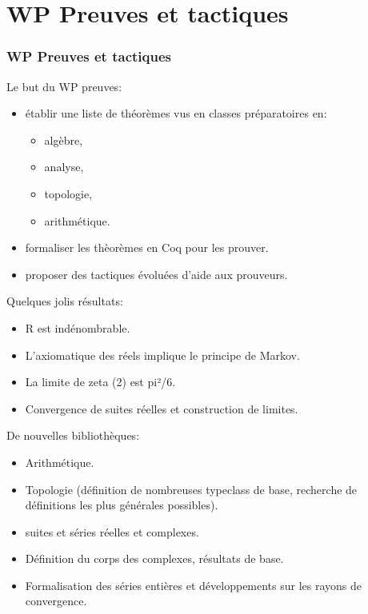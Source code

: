 \documentclass[slidetop]{beamer}
\begin{document}
\section{WP Preuves et tactiques}
\begin{frame}
\frametitle{WP Preuves et tactiques} 

Le but du WP preuves:
\begin{itemize}
  \item établir une liste de théorèmes vus en classes préparatoires en: 
  \begin{itemize}
    \item algèbre,
    \item analyse,
    \item topologie,
    \item arithmétique.
  \end{itemize}
  \item formaliser les thèorèmes en Coq pour les prouver.
  \item proposer des tactiques évoluées d'aide aux prouveurs. 
\end{itemize}

\end{frame}


\begin{frame}
 
Quelques jolis résultats:
\begin{itemize}
  \item R est indénombrable.
  \item L'axiomatique des réels implique le principe de Markov.
  \item La limite de zeta (2) est pi²/6.
  \item Convergence de suites réelles et construction de limites.
\end{itemize}
\end{frame}

\begin{frame}
De nouvelles bibliothèques:
\begin{itemize}
  \item Arithmétique.
  \item Topologie (définition de nombreuses typeclass de base, recherche de définitions les plus générales possibles).
  \item suites et séries réelles et complexes.
  \item Définition du corps des complexes, résultats de base.
  \item Formalisation des séries entières et développements sur les rayons de convergence.
\end{itemize}
\end{frame}
\end{document}
